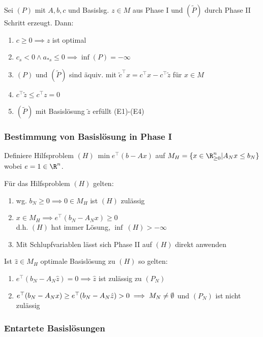 Sei \((P)\) mit \(A,b,c\) und Basislsg. \(z \in M\) aus Phase I und \((\tilde P)\)  durch Phase II Schritt erzeugt. Dann:

\begin{enumerate}[label=(\alph*)]
	\item \(c \geq 0 \implies z\) ist optimal
	\item \(c_s < 0 \land a_{*s} \leq 0 \implies \inf (P) = -\infty\)
	\item \((P)\) und \((\tilde P)\) sind äquiv. mit \(\tilde c^\top x = c^\top x - c^\top \tilde z\) für \(x \in M\)
	\item \(c^\top \tilde z \leq c^\top z = 0\)
	\item \((\tilde P)\) mit Basislösung \(\tilde z\) erfüllt (E1)-(E4)
\end{enumerate}

\subsubsection*{Bestimmung von Basislösung in Phase I}

Definiere Hilfsproblem \((H) \ \min e^\top (b-Ax)\) auf \(M_H = \{ x \in \R_{\geq 0}^n | A_N x \leq b_N \}\) wobei \(e = 1 \in \R^n\).

Für das Hilfsproblem \((H)\) gelten:

\begin{enumerate}[label=(\alph*)]
	\item wg. \(b_N \geq 0 \implies 0 \in M_H\) ist \((H)\) zulässig
	\item \(x \in M_H \implies e^\top (b_N - A_N x) \geq 0\) \\ d.h. \((H)\) hat immer Lösung, \(\inf \ (H) > -\infty\)
	\item Mit Schlupfvariablen lässt sich Phase II auf \((H)\) direkt anwenden
\end{enumerate}

Ist \(\hat z \in M_H\) optimale Basislösung zu \((H)\) so gelten:

\begin{enumerate}[label=(\alph*)]
	\item \(e^\top (b_N - A_N \hat z) = 0 \implies \hat z\) ist zulässig zu \((P_N)\)
	\item \(e^\top (b_N - A_N x) \geq e^\top (b_N - A_N \hat z) > 0 \\ \implies M_N \neq \emptyset\) und \((P_N)\) ist nicht zulässig
\end{enumerate}

\subsubsection*{Entartete Basislösungen}

